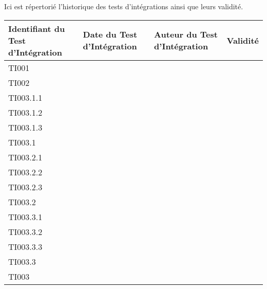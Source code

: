 
Ici est répertorié l'historique des tests d'intégrations ainsi que leurs validité. \\

\begin{table}[H]
\centering
	\begin{tabularx}{17.4cm}{|X|X|X|X|}
	\hline
	\rowcolor{gray!40} Identifiant du Test d'Intégration & Date du Test d'Intégration & Auteur du Test d'Intégration & Validité\\
	\hline
	 TI001 &  & & \\
	\hline
	 TI002 &  & & \\
	\hline
	 TI003.1.1 &  & & \\
	\hline
	 TI003.1.2 &  & & \\
	\hline
	 TI003.1.3 &  & & \\
	\hline
	 TI003.1 &  & & \\
	\hline
	 TI003.2.1 &  & & \\
	\hline
	 TI003.2.2 &  & & \\
	\hline
	 TI003.2.3 &  & & \\
	\hline
	 TI003.2 &  & & \\
	\hline
	 TI003.3.1 &  & & \\
	\hline
	 TI003.3.2 &  & & \\
	\hline
	 TI003.3.3 &  & & \\
	\hline
	 TI003.3 &  & & \\
	\hline
	 TI003 &  & & \\
	\hline
	\end{tabularx}
\end{table}

